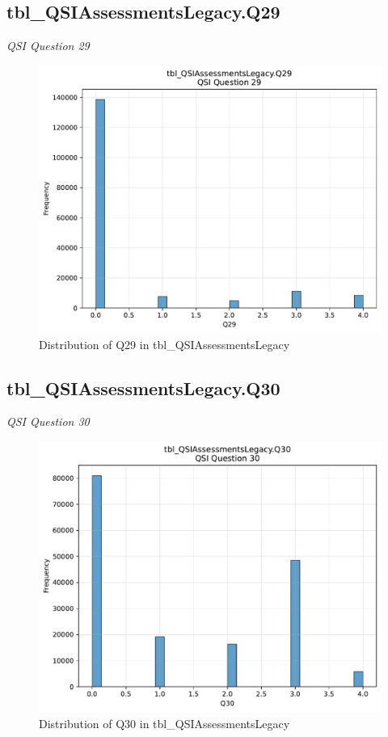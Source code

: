 \subsection{tbl\_QSIAssessmentsLegacy.Q29}
\textit{QSI Question 29}

\begin{figure}[htbp]
\centering
\includegraphics[width=\textwidth]{figures/dbo_tbl_QSIAssessmentsLegacy_Q29.pdf}
\caption{Distribution of Q29 in tbl\_QSIAssessmentsLegacy}
\end{figure}\newpage

\subsection{tbl\_QSIAssessmentsLegacy.Q30}
\textit{QSI Question 30}

\begin{figure}[htbp]
\centering
\includegraphics[width=\textwidth]{figures/dbo_tbl_QSIAssessmentsLegacy_Q30.pdf}
\caption{Distribution of Q30 in tbl\_QSIAssessmentsLegacy}
\end{figure}\newpage

